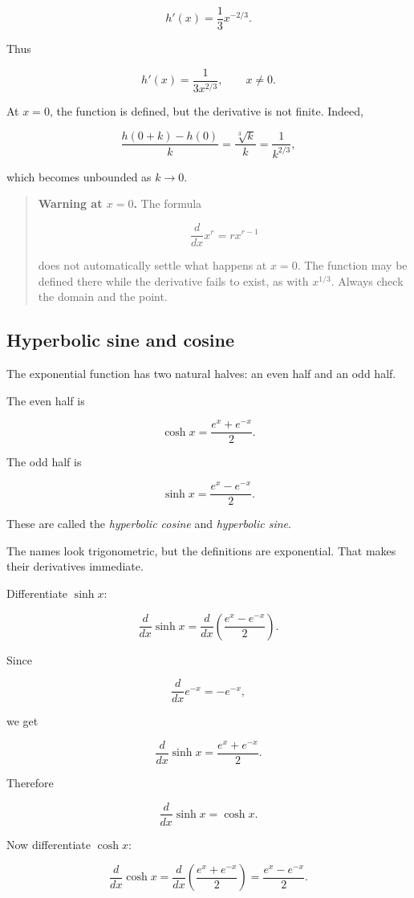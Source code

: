 \[
h'(x)=\frac13x^{-2/3}.
\]

Thus

\[
\boxed{
h'(x)=\frac1{3x^{2/3}},
\qquad x\neq0.
}
\]

At \(x=0\), the function is defined, but the derivative is not finite.  Indeed,

\[
\frac{h(0+k)-h(0)}{k}
=
\frac{\sqrt[3]{k}}{k}
=
\frac1{k^{2/3}},
\]

which becomes unbounded as \(k\to0\).

\begin{quote}
\textbf{Warning at \(x=0\).}
The formula

\[
\frac{d}{dx}x^r=rx^{r-1}
\]

does not automatically settle what happens at \(x=0\).  The function may be defined there while the derivative fails to exist, as with \(x^{1/3}\).  Always check the domain and the point.
\end{quote}

\subsection{Hyperbolic sine and cosine}
\label{subsec:hyperbolic-sine-cosine}

The exponential function has two natural halves: an even half and an odd half.

The even half is

\[
\cosh x=\frac{e^x+e^{-x}}2.
\]

The odd half is

\[
\sinh x=\frac{e^x-e^{-x}}2.
\]

These are called the \emph{hyperbolic cosine} and \emph{hyperbolic sine}.

The names look trigonometric, but the definitions are exponential.  That makes their derivatives immediate.

Differentiate \(\sinh x\):

\[
\frac{d}{dx}\sinh x
=
\frac{d}{dx}\left(\frac{e^x-e^{-x}}2\right).
\]

Since

\[
\frac{d}{dx}e^{-x}=-e^{-x},
\]

we get

\[
\frac{d}{dx}\sinh x
=
\frac{e^x+e^{-x}}2.
\]

Therefore

\[
\boxed{
\frac{d}{dx}\sinh x=\cosh x.
}
\]

Now differentiate \(\cosh x\):

\[
\frac{d}{dx}\cosh x
=
\frac{d}{dx}\left(\frac{e^x+e^{-x}}2\right)
=
\frac{e^x-e^{-x}}2.
\]

